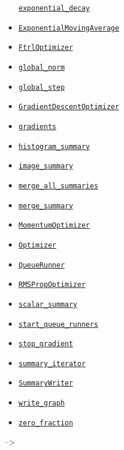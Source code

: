 \begin{itemize}
  \href{../../api_docs/python/train.md\#exponential_decay}{\texttt{exponential\_decay}}
\item
  \href{../../api_docs/python/train.md\#ExponentialMovingAverage}{\texttt{ExponentialMovingAverage}}
\item
  \href{../../api_docs/python/train.md\#FtrlOptimizer}{\texttt{FtrlOptimizer}}
\item
  \href{../../api_docs/python/train.md\#global_norm}{\texttt{global\_norm}}
\item
  \href{../../api_docs/python/train.md\#global_step}{\texttt{global\_step}}
\item
  \href{../../api_docs/python/train.md\#GradientDescentOptimizer}{\texttt{GradientDescentOptimizer}}
\item
  \href{../../api_docs/python/train.md\#gradients}{\texttt{gradients}}
\item
  \href{../../api_docs/python/train.md\#histogram_summary}{\texttt{histogram\_summary}}
\item
  \href{../../api_docs/python/train.md\#image_summary}{\texttt{image\_summary}}
\item
  \href{../../api_docs/python/train.md\#merge_all_summaries}{\texttt{merge\_all\_summaries}}
\item
  \href{../../api_docs/python/train.md\#merge_summary}{\texttt{merge\_summary}}
\item
  \href{../../api_docs/python/train.md\#MomentumOptimizer}{\texttt{MomentumOptimizer}}
\item
  \href{../../api_docs/python/train.md\#Optimizer}{\texttt{Optimizer}}
\item
  \href{../../api_docs/python/train.md\#QueueRunner}{\texttt{QueueRunner}}
\item
  \href{../../api_docs/python/train.md\#RMSPropOptimizer}{\texttt{RMSPropOptimizer}}
\item
  \href{../../api_docs/python/train.md\#scalar_summary}{\texttt{scalar\_summary}}
\item
  \href{../../api_docs/python/train.md\#start_queue_runners}{\texttt{start\_queue\_runners}}
\item
  \href{../../api_docs/python/train.md\#stop_gradient}{\texttt{stop\_gradient}}
\item
  \href{../../api_docs/python/train.md\#summary_iterator}{\texttt{summary\_iterator}}
\item
  \href{../../api_docs/python/train.md\#SummaryWriter}{\texttt{SummaryWriter}}
\item
  \href{../../api_docs/python/train.md\#write_graph}{\texttt{write\_graph}}
\item
  \href{../../api_docs/python/train.md\#zero_fraction}{\texttt{zero\_fraction}}
\end{itemize}

--\textgreater{}


